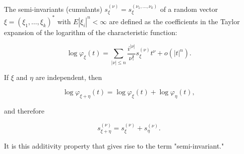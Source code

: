 The semi-invariants (cumulants) $s_{\xi}^{(\nu)} = s_{\xi}^{(\nu_1, \ldots, \nu_k)}$ of a random vector $\xi = (\xi_1, \ldots, \xi_k)^*$ with $E|\xi_i|^n < \infty$ are defined as the coefficients in the Taylor expansion of the logarithm of the characteristic function:

$$\log \varphi_{\xi}(t) = \sum_{|\nu| \leq n} \frac{i^{|\nu|}}{\nu!} s_{\xi}^{(\nu)} t^{\nu} + o(|t|^n).$$

If $\xi$ and $\eta$ are independent, then

$$\log \varphi_{\xi+\eta}(t) = \log \varphi_{\xi}(t) + \log \varphi_{\eta}(t),$$

and therefore

$$s_{\xi+\eta}^{(\nu)} = s_{\xi}^{(\nu)} + s_{\eta}^{(\nu)}.$$

It is this additivity property that gives rise to the term "semi-invariant."
